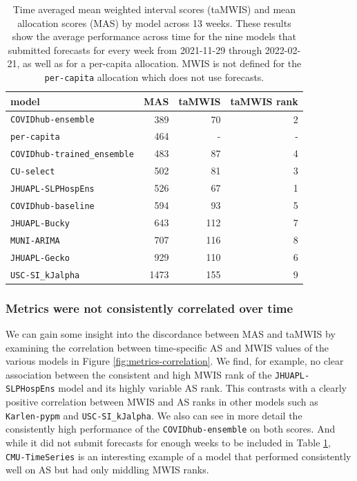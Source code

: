 \documentclass{article}\usepackage[]{graphicx}\usepackage[]{xcolor}
\begin{document}
\begin{table}[ht]
\centering
\begin{tabular}{lrrr}
  \hline
model & MAS & taMWIS & taMWIS rank \\ 
  \hline
\texttt{COVIDhub-ensemble} & 389 & 70 & 2 \\ 
  \texttt{per-capita} & 464 & - & - \\ 
  \texttt{COVIDhub-trained\_ensemble} & 483 & 87 & 4 \\ 
  \texttt{CU-select} & 502 & 81 & 3 \\ 
  \texttt{JHUAPL-SLPHospEns} & 526 & 67 & 1 \\ 
  \texttt{COVIDhub-baseline} & 594 & 93 & 5 \\ 
  \texttt{JHUAPL-Bucky} & 643 & 112 & 7 \\ 
  \texttt{MUNI-ARIMA} & 707 & 116 & 8 \\ 
  \texttt{JHUAPL-Gecko} & 929 & 110 & 6 \\ 
  \texttt{USC-SI\_kJalpha} & 1473 & 155 & 9 \\ 
   \hline
\end{tabular}
\caption{Time averaged mean weighted interval scores (taMWIS) and mean allocation scores (MAS) by model across 13 weeks. These results show the average performance across time for the nine models that submitted forecasts for every week from 2021-11-29 through 2022-02-21, as well
  as for a per-capita allocation. MWIS is not defined for the \texttt{per-capita} allocation which does not use forecasts.} 
\label{tab:multi-week-performance-summary}
\end{table}


\subsubsection{Metrics were not consistently correlated over time}

We can gain some insight into the discordance between MAS and taMWIS by examining the correlation between time-specific
AS and MWIS values of the various models in Figure \ref{fig:metrics-correlation}. We find, for example, no clear
association between the consistent and high MWIS rank of the \texttt{JHUAPL-SLPHospEns} model and its highly variable AS
rank. This contrasts with a clearly positive correlation between MWIS and AS ranks in other models such as
\texttt{Karlen-pypm} and \texttt{USC-SI\_kJalpha}. We also can see in more detail the consistently high performance of the
\texttt{COVIDhub-ensemble} on both scores. And while it did not submit forecasts for enough weeks to be included in
Table \ref{tab:multi-week-performance-summary}, \texttt{CMU-TimeSeries} is an interesting example of a model that
performed consistently well on AS but had only middling MWIS ranks.
\end{document}
